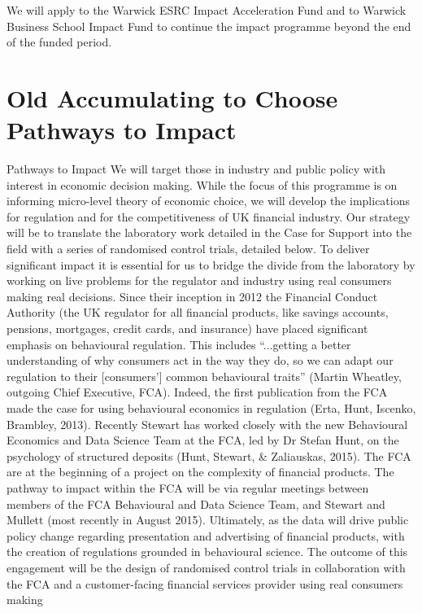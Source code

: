 \documentclass[11pt, a4paper]{article}
\begin{document}
We will apply to the Warwick ESRC Impact Acceleration Fund and to Warwick Business School Impact Fund to continue the impact programme beyond the end of the funded period. 





\section{Old Accumulating to Choose Pathways to Impact}

Pathways to Impact
We will target those in industry and public policy with interest in economic decision making.
While the focus of this programme is on informing micro-level theory of economic choice,
we will develop the implications for regulation and for the competitiveness of UK financial
industry. Our strategy will be to translate the laboratory work detailed in the Case for Support
into the field with a series of randomised control trials, detailed below. To deliver significant
impact it is essential for us to bridge the divide from the laboratory by working on live
problems for the regulator and industry using real consumers making real decisions.
Since their inception in 2012 the Financial Conduct Authority (the UK regulator for all
financial products, like savings accounts, pensions, mortgages, credit cards, and insurance)
have placed significant emphasis on behavioural regulation. This includes “...getting a better
understanding of why consumers act in the way they do, so we can adapt our regulation to
their [consumers’] common behavioural traits” (Martin Wheatley, outgoing Chief Executive,
FCA). Indeed, the first publication from the FCA made the case for using behavioural
economics in regulation (Erta, Hunt, Iscenko, Brambley, 2013). Recently Stewart has worked
closely with the new Behavioural Economics and Data Science Team at the FCA, led by Dr
Stefan Hunt, on the psychology of structured deposits (Hunt, Stewart, \& Zaliauskas, 2015).
The FCA are at the beginning of a project on the complexity of financial products. The
pathway to impact within the FCA will be via regular meetings between members of the FCA
Behavioural and Data Science Team, and Stewart and Mullett (most recently in August 2015).
Ultimately, as the data will drive public policy change regarding presentation and advertising
of financial products, with the creation of regulations grounded in behavioural science. The
outcome of this engagement will be the design of randomised control trials in collaboration
with the FCA and a customer-facing financial services provider using real consumers making
\end{document}
